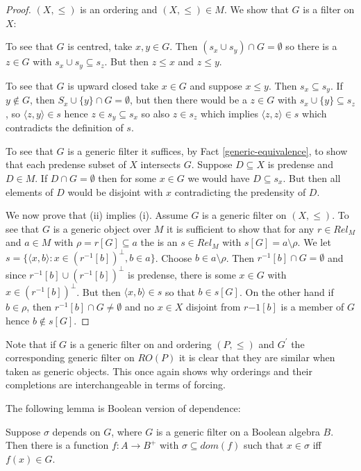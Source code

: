 \begin{proof}
$(X,\leq)$ is an ordering and $(X,\leq)\in M$. We show that $G$ is a filter on $X$:

To see that $G$ is centred, take $x,y\in G$. Then $(s_x\cup s_y)\cap G=\emptyset$
so there is a $z\in G$ with $s_x\cup s_y\subseteq s_z$. But then $z\leq x$ and $z\leq y$.

To see that $G$ is upward closed take $x\in G$ and suppose $x\leq y$. Then $s_x\subseteq s_y$. If $y\not\in G$, then $S_x\cup\{y\}\cap G=\emptyset$, but then
there would be a $z\in G$ with $s_x\cup\{y\}\subseteq s_z$, so $\langle z,y\rangle\in s$ hence $z\in s_y\subseteq s_x$ so also $z\in s_z$ which implies $\langle z,z\rangle\in s$ which contradicts the definition of $s$.

To see that $G$ is a generic filter it suffices, by Fact \ref{generic-equivalence}, to show that each predense subset of $X$ intersects $G$. Suppose $D\subseteq X$
is predense and $D\in M$. If $D\cap G=\emptyset$ then for some $x\in G$ we would have $D\subseteq s_x$. But then all elements of $D$ would be disjoint with $x$
contradicting the predensity of $D$.

We now prove that (ii) implies (i). Assume $G$ is a generic filter on $(X,\leq)$. To see that $G$ is a generic object over $M$ it is sufficient to show that for
any $r\in Rel_M$ and $a\in M$ with $\rho=r[G]\subseteq a$ the is an $s\in Rel_M$ with $s[G]=a\setminus\rho$. We let $s=\{\langle x,b\rangle:x\in (r^{-1}[b])^{\perp},b\in a\}$. Choose $b\in a\setminus\rho$. Then $r^{-1}[b]\cap G=\emptyset$ and since $r^{-1}[b]\cup (r^{-1}[b])^\perp$ is predense, there is some $x\in G$ with $x\in (r^{-1}[b])^\perp$. But then $\langle x,b\rangle\in s$ so that $b\in s[G]$. On the other hand if $b\in\rho$, then $r^{-1}[b]\cap G\neq\emptyset$ and no $x\in X$
disjoint from $r{-1}[b]$ is a member of $G$ hence $b\not\in s[G]$.
\end{proof}


\begin{note}
Note that if $G$ is a generic filter on and ordering $(P,\leq)$ and $G^\prime$ the corresponding generic filter on $RO(P)$ it is clear that
they are similar when taken as generic objects. This once again shows why orderings and their completions are interchangeable in terms of forcing.
\end{note}

The following lemma is Boolean version of dependence:

\begin{lemma}\label{special-names}
Suppose $\sigma$ depends on $G$, where $G$ is a generic filter on a Boolean algebra $B$. Then there is a function $f:A\to B^+$
with $\sigma\subseteq dom(f)$ such that $x\in\sigma$ iff $f(x)\in G$.
\end{lemma}

